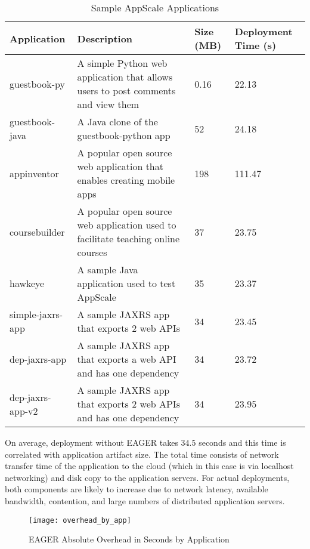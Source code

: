 \begin{table}[t]
\begin{center}
\begin{tabular}{| p{1.5cm} | p{3.2cm} | p{0.5cm} | p{1.1cm} | }
\hline
Application & Description & Size (MB) & Deployment Time (s) \\ \hline
guestbook-py & A simple Python web application that allows users to post
comments and view them & 0.16 & 22.13 \\ \hline
guestbook-java & A Java clone of the guestbook-python app & 52 & 24.18 \\ \hline
appinventor & A popular open source web application that enables creating mobile apps & 198 & 111.47 \\ \hline
coursebuilder & A popular open source web application used to facilitate teaching online courses & 37 & 23.75 \\ \hline
hawkeye & A sample Java application used to test AppScale & 35 & 23.37 \\ \hline
simple-jaxrs-app & A sample JAXRS app that exports 2 web APIs & 34 & 23.45 \\ \hline
dep-jaxrs-app & A sample JAXRS app that exports a web API and has one dependency & 34 & 23.72 \\ \hline
dep-jaxrs-app-v2 & A sample JAXRS app that exports 2 web APIs and has one dependency & 34 & 23.95 \\ \hline
\end{tabular}
\end{center}
\caption{Sample AppScale Applications}
\label{tab:sample_apps}
\end{table}

On average, deployment without EAGER takes $34.5$ seconds and this time 
is correlated with application artifact size.  The total time consists
of network transfer time of the application to the cloud (which in this 
case is via localhost networking) and disk copy to the application servers.
For actual deployments, both components are likely to increase due to network
latency, available bandwidth, contention, and large numbers of distributed
application servers.


\begin{figure*}
\centering
\texttt{[image: overhead\_by\_app]}
\caption{EAGER Absolute Overhead in Seconds by Application}
\label{fig:overhead_by_app}
\end{figure*}

